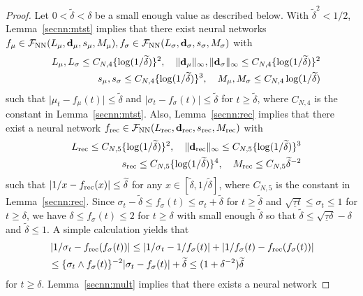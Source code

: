 \documentclass[twoside,11pt]{article}
\def\cF{\mathcal F}
\newcommand{\bd}{{\bf d}}
\newcommand{\be}{\begin{equation}}
\newcommand{\ee}{\end{equation}}
\newcommand{\bean}{\setlength\arraycolsep{1pt}\begin{eqnarray*}}
\newcommand{\eean}{\end{eqnarray*}}
\begin{document}
\begin{proof}
Let $0 < \widetilde \delta < \delta$ be a small enough value as described below.
With ${\widetilde \delta}^2 < 1/2$, Lemma~\ref{secnn:mtst} implies that
there exist neural networks  $f_{\mu} \in \cF_{\rm NN}(L_{\mu},\bd_{\mu},s_{\mu},M_{\mu}), f_{\sigma} \in \cF_{\rm NN}(L_{\sigma},\bd_{\sigma},s_{\sigma},M_{\sigma})$ with
\bean
&& L_{\mu}, L_{\sigma} \leq C_{N,4} \{ \log(1/\widetilde \delta)\}^{2}, \quad \|\bd_{\mu} \|_{\infty},  \| \bd_{\sigma}\|_{\infty} \leq C_{N,4}  \{ \log(1/\widetilde \delta)\}^{2}
\\
&& s_{\mu}, s_{\sigma} \leq C_{N,4}  \{  \log(1/\widetilde \delta)\}^{3}, \quad M_{\mu}, M_{\sigma} \leq C_{N,4}  \log ( 1/\widetilde \delta)
\eean
such that $
\vert \mu_{t} - f_{\mu}(t) \vert \leq \widetilde \delta$ and $ \vert \sigma_{t} - f_{\sigma}(t) \vert \leq \widetilde \delta$
for $ t \geq \widetilde \delta$, where $C_{N,4}$ is the constant in Lemma~\ref{secnn:mtst}.
Also, Lemma~\ref{secnn:rec} implies that there exist a neural network $f_{\rm rec} \in \cF_{\rm NN}(L_{\rm rec}, \bd_{\rm rec}, s_{\rm rec}, M_{\rm rec} )$ with
\bean
&& L_{\rm rec} \leq C_{N,5} \{ \log(1/ \widetilde \delta )\}^{2}, \quad \|\bd_{\rm rec}\|_{\infty} \leq C_{N,5}  \{ \log (1/ \widetilde \delta )\}^{3}
\\
&& s_{\rm rec}  \leq C_{N,5}  \{ \log(1/ \widetilde \delta )\}^{4}, \quad M_{\rm rec} \leq C_{N,5} \widetilde \delta^{-2}
\eean
such that $\vert 1/x - f_{\rm rec}(x) \vert \leq  \widetilde \delta $ for any $x \in [ \widetilde \delta,1/ \widetilde \delta]$, where $C_{N,5}$ is the constant in Lemma~\ref{secnn:rec}.
Since $  \sigma_t-\widetilde \delta \leq f_{\sigma}(t)  \leq \sigma_t + \widetilde \delta$ for $t \geq \widetilde \delta$ and $\sqrt{\underline{\tau} t } \leq \sigma_t \leq 1$ for $t \geq \delta$, we have $\delta \leq f_{\sigma}(t)  \leq 2$ for $ t \geq \delta $ with small enough $\widetilde \delta$ so that $\widetilde \delta \leq \sqrt{\underline{\tau} 
\delta} - \delta$ and $\widetilde \delta \leq 1$.
A simple calculation yields that
\be \begin{split}
& \left\vert 1/\sigma_t - f_{\rm rec}(f_{\sigma}(t)) \right\vert \leq
\left\vert 1/\sigma_t - 1/ f_{\sigma}(t) \right\vert  + \left\vert  1/ f_{\sigma}(t) - f_{\rm rec}(f_{\sigma}(t)) \right\vert 
\\
& \leq \{ \sigma_t \wedge f_{\sigma}(t)\}^{-2} \vert \sigma_t - f_{\sigma}(t) \vert + \widetilde \delta \leq (1+\delta^{-2}) \widetilde \delta  \label{eqprop2:nnlogrecst}
\end{split} \ee
for $t \geq \delta$. 
Lemma~\ref{secnn:mult} implies that there exists a neural network 

\end{proof}
\end{document}
